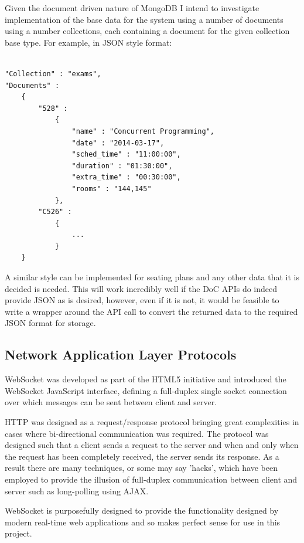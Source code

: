 \documentclass[a4paper, 12pt, notitlepage]{report}
\begin{document}
Given the document driven nature of MongoDB I intend to investigate implementation of the base data for the system using a number of documents using a number collections, each containing a document for the given collection base type.  For example, in JSON style format:

\begin{minipage}{\textwidth}
\begin{lstlisting}[captionpos=b,caption=Example MongoDB Storage Structure for Exam information, tabsize=2,
    breaklines=true]

"Collection" : "exams",
"Documents" :
	{
		"528" : 
			{
				"name" : "Concurrent Programming",
				"date" : "2014-03-17",
				"sched_time" : "11:00:00",
				"duration" : "01:30:00",
				"extra_time" : "00:30:00",
				"rooms" : "144,145"
			},
		"C526" : 
			{
				...
			}
	}

\end{lstlisting}
\end{minipage}

A similar style can be implemented for seating plans and any other data that it is decided is needed.  This will work incredibly well if the DoC APIs do indeed provide JSON as is desired, however, even if it is not, it would be feasible to write a wrapper around the API call to convert the returned data to the required JSON format for storage.

\subsection{Network Application Layer Protocols}

WebSocket was developed as part of the HTML5 initiative and introduced the WebSocket JavaScript interface, defining a full-duplex single socket connection over which messages can be sent between client and server.

HTTP was designed as a request/response protocol bringing great complexities in cases where bi-directional communication was required.  The protocol was designed such that a client sends a request to the server and when and only when the request has been completely received, the server sends its response. As a result there are many techniques, or some may say 'hacks'\cite{httpabuse}, which have been employed to provide the illusion of full-duplex communication between client and server such as long-polling using AJAX\cite{lpAjax}.

WebSocket is purposefully designed to provide the functionality designed by modern real-time web applications and so makes perfect sense for use in this project.
\end{document}
